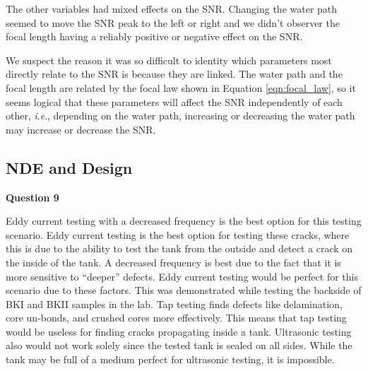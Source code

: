 \documentclass[12 pt]{report}
\newcommand{\ie}{\textit{i}.\textit{e}., }
\begin{document}
The other variables had mixed effects on the SNR. Changing the water path seemed to move the SNR peak to the left or right and we didn't observer the focal length having a reliably positive or negative effect on the SNR.

We suspect the reason it was so difficult to identity which parameters most directly relate to the SNR is because they are linked. The water path and the focal length are related by the focal law shown in Equation \ref{eqn:focal_law}, so it seems logical that these parameters will affect the SNR independently of each other, \ie depending on the water path, increasing or decreasing the water path may increase or decrease the SNR.

\subsection{NDE and Design} \label{nde_and_design}
\textbf{Question 9}

Eddy current testing with a decreased frequency is the best option for this testing scenario. Eddy current testing is the best option for testing these cracks, where this is due to the ability to test the tank from the outside and detect a crack on the inside of the tank. A decreased frequency is best due to the fact that it is more sensitive to ``deeper'' defects. Eddy current testing would be perfect for this scenario due to these factors. This was demonstrated while testing the backside of BKI and BKII samples in the lab. Tap testing finds defects like delamination, core un-bonds, and crushed cores more effectively. This means that tap testing would be useless for finding cracks propagating inside a tank. Ultrasonic testing also would not work solely since the tested tank is sealed on all sides. While the tank may be full of a medium perfect for ultrasonic testing, it is impossible.
\end{document}
